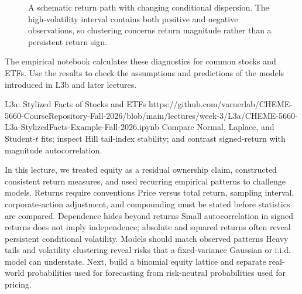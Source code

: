 \documentclass[11pt]{article}
\begin{document}
\begin{figure}[ht]
  \centering
  \caption{A schematic return path with changing conditional dispersion. The high-volatility interval contains both positive and negative observations, so clustering concerns return magnitude rather than a persistent return sign.}
  \label{fig:volatility-clustering}
\end{figure}

The empirical notebook calculates these diagnostics for common stocks and ETFs. Use the results to check the assumptions and predictions of the models introduced in L3b and later lectures.

\notebooklink
  {L3a: Stylized Facts of Stocks and ETFs}
  {https://github.com/varnerlab/CHEME-5660-CourseRepository-Fall-2026/blob/main/lectures/week-3/L3a/CHEME-5660-L3a-StylizedFacts-Example-Fall-2026.ipynb}
  {Compare Normal, Laplace, and Student-$t$ fits; inspect Hill tail-index stability; and contrast signed-return with magnitude autocorrelation.}

\newpage
\thispagestyle{fancy}
\keytakeaways
  {In this lecture, we treated equity as a residual ownership claim, constructed consistent return measures, and used recurring empirical patterns to challenge models.}
  {Returns require conventions}
  {Price versus total return, sampling interval, corporate-action adjustment, and compounding must be stated before statistics are compared.}
  {Dependence hides beyond returns}
  {Small autocorrelation in signed returns does not imply independence; absolute and squared returns often reveal persistent conditional volatility.}
  {Models should match observed patterns}
  {Heavy tails and volatility clustering reveal risks that a fixed-variance Gaussian or i.i.d. model can understate.}
  {Next, build a binomial equity lattice and separate real-world probabilities used for forecasting from risk-neutral probabilities used for pricing.}
\end{document}
